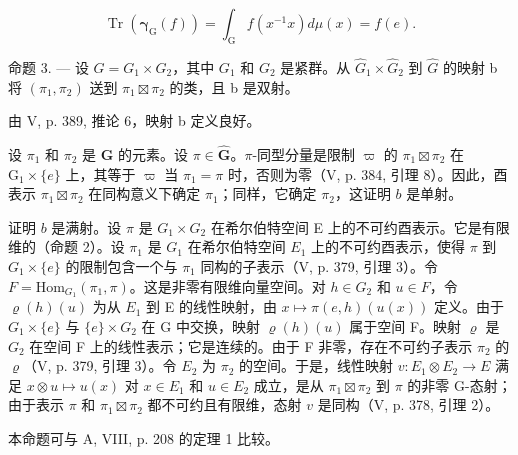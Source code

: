 \[
\operatorname{Tr} \left(\boldsymbol {\gamma} _ {\mathrm{G}} (f)\right) = \int_ {\mathrm{G}} f \left(x ^ {- 1} x\right) d \mu (x) = f (e).
\]

命题 3. --- 设 \(G = G_{1} \times G_{2}\)，其中 \(G_{1}\) 和 \(G_{2}\) 是紧群。从 \(\widehat{G}_{1} \times \widehat{G}_{2}\) 到 \(\widehat{G}\) 的映射 b 将 \((\pi_{1}, \pi_{2})\) 送到 \(\pi_{1} \boxtimes \pi_{2}\) 的类，且 b 是双射。

由 V, p. 389, 推论 6，映射 b 定义良好。

设 \(\pi_1\) 和 \(\pi_2\) 是 \(\widehat{\mathbf{G}}\) 的元素。设 \(\pi \in \widehat{\mathbf{G}}\)。\(\pi\)-同型分量是限制 \(\varpi\) 的 \(\pi_1 \boxtimes \pi_2\) 在 \(\mathrm{G}_1 \times \{e\}\) 上，其等于 \(\varpi\) 当 \(\pi_1 = \pi\) 时，否则为零（V, p. 384, 引理 8）。因此，酉表示 \(\pi_1 \boxtimes \pi_2\) 在同构意义下确定 \(\pi_1\)；同样，它确定 \(\pi_2\)，这证明 \(b\) 是单射。

证明 \(b\) 是满射。设 \(\pi\) 是 \(G_1 \times G_2\) 在希尔伯特空间 E 上的不可约酉表示。它是有限维的（命题 2）。设 \(\pi_1\) 是 \(G_1\) 在希尔伯特空间 \(E_1\) 上的不可约酉表示，使得 \(\pi\) 到 \(G_1 \times \{e\}\) 的限制包含一个与 \(\pi_1\) 同构的子表示（V, p. 379, 引理 3）。令 \(F = \text{Hom}_{G_1}(\pi_1, \pi)\)。这是非零有限维向量空间。对 \(h \in G_2\) 和 \(u \in F\)，令 \(\varrho(h)(u)\) 为从 \(E_1\) 到 E 的线性映射，由 \(x \mapsto \pi(e, h)(u(x))\) 定义。由于 \(G_1 \times \{e\}\) 与 \(\{e\} \times G_2\) 在 G 中交换，映射 \(\varrho(h)(u)\) 属于空间 F。映射 \(\varrho\) 是 \(G_2\) 在空间 F 上的线性表示；它是连续的。由于 F 非零，存在不可约子表示 \(\pi_2\) 的 \(\varrho\)（V, p. 379, 引理 3）。令 \(E_2\) 为 \(\pi_2\) 的空间。于是，线性映射 \(v: E_1 \otimes E_2 \to E\) 满足 \(x \otimes u \mapsto u(x)\) 对 \(x \in E_1\) 和 \(u \in E_2\) 成立，是从 \(\pi_1 \boxtimes \pi_2\) 到 \(\pi\) 的非零 G-态射；由于表示 \(\pi\) 和 \(\pi_1 \boxtimes \pi_2\) 都不可约且有限维，态射 \(v\) 是同构（V, p. 378, 引理 2）。

本命题可与 A, VIII, p. 208 的定理 1 比较。

